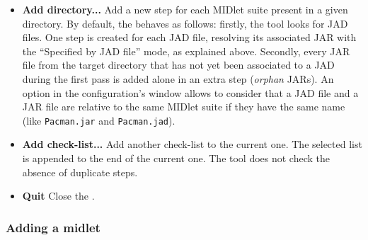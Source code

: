 \begin{itemize}
{}{}

\item{\textbf{Add directory...}} Add a new step for each MIDlet suite
present in a given directory. By default, the \ma behaves as follows: firstly,
the tool looks for JAD files. One step is created for each JAD file,
resolving its associated JAR with the ``Specified by JAD file'' mode,
as explained above. Secondly, every JAR file from the target directory
that has not yet been associated to a JAD during the first pass is
added alone in an extra step (\emph{orphan} JARs). An option in the
configuration's window allows to consider that a JAD file and a JAR file are
relative to the same MIDlet suite if they have the same name (like
\texttt{Pacman.jar} and \texttt{Pacman.jad}).
\item{\textbf{Add check-list...}} Add another check-list to the current
one. The selected list is appended to the end of the current one. The
tool does not check the absence of duplicate steps.
\item{\textbf{Quit}} Close the \ma.
\end{itemize}

\subsubsection{Adding a midlet}

